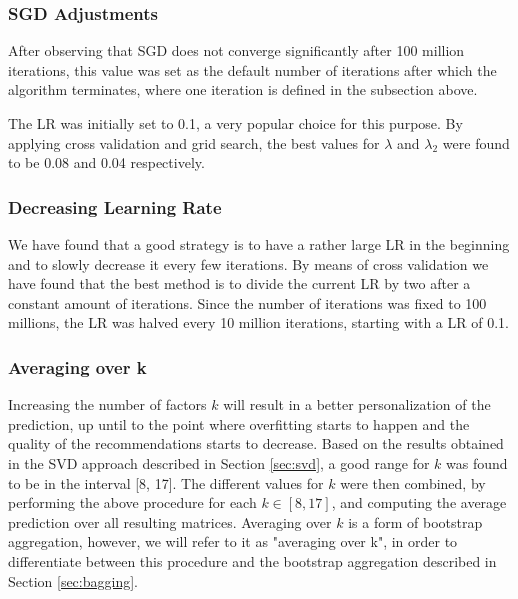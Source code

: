 \subsubsection{SGD Adjustments}

After observing that \ac{SGD} does not converge significantly after 100 million iterations, this value was set as the default number of iterations after which the algorithm terminates, where one iteration is defined in the subsection above. 

The \ac{LR} was initially set to 0.1, a very popular choice for this purpose. By applying cross validation and grid search, the best values for $\lambda$ and $\lambda_2$ were found to be 0.08 and 0.04 respectively. 

\subsubsection{Decreasing Learning Rate\cite{lau_2020}} \label{sec:sgd_lr}

We have found that a good strategy is to have a rather large \ac{LR} in the beginning and to slowly decrease it every few iterations. By means of cross validation we have found that the best method is to divide the current \ac{LR} by two after a constant amount of iterations. Since the number of iterations was fixed to 100 millions, the \ac{LR} was halved every 10 million iterations, starting with a \ac{LR} of 0.1.

\subsubsection{Averaging over k}\label{sec:sgd_k}

Increasing the number of factors $k$ will result in a better personalization of the prediction, up until to the point where overfitting starts to happen and the quality of the recommendations starts to decrease. 
Based on the results obtained in the \ac{SVD} approach described in Section \ref{sec:svd}, a good range for $k$ was found to be in the interval [8, 17]. The different values for $k$ were then combined, by performing the above procedure for each $k \in [8,17]$, and computing the average prediction over all resulting matrices. Averaging over $k$ is a form of bootstrap aggregation, however, we will refer to it as "averaging over k", in order to differentiate between this procedure and the bootstrap aggregation described in Section \ref{sec:bagging}.